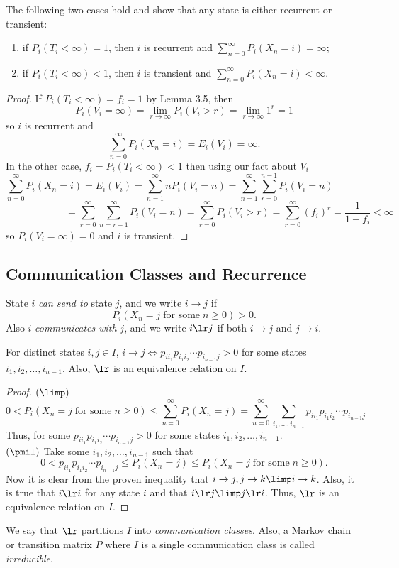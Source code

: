 \begin{thm} The following two cases hold and show that any state is either recurrent or transient:
\begin{enumerate}
\item if $P_i(T_i<\infty)=1$, then $i$ is recurrent and $\sum_{n=0}^{\infty}P_i(X_n=i)=\infty$;
\item if $P_i(T_i<\infty)<1$, then $i$ is transient and $\sum_{n=0}^{\infty}P_i(X_n=i)<\infty$.
\end{enumerate}
\end{thm}
\begin{proof} If $P_i(T_i<\infty)=f_i=1$ by Lemma 3.5, then
\[P_i(V_i=\infty)=\lim_{r \to \infty} P_i(V_i>r) = \lim_{r \to \infty} 1^r = 1 \]
so $i$ is recurrent and
\[\sum_{n=0}^{\infty}P_i(X_n=i)=E_i(V_i)=\infty.\]
In the other case, $f_i=P_i(T_i<\infty)<1$ then using our fact about $V_i$
\[\sum_{n=0}^{\infty}P_i(X_n=i)=E_i(V_i)=\sum_{n=1}^{\infty}nP_i(V_i=n)=\sum_{n=1}^{\infty}\sum_{r=0}^{n-1}P_i(V_i=n)\qquad\qquad\qquad\qquad\]
\[\qquad\qquad\qquad=\sum_{r=0}^{\infty}\sum_{n=r+1}^{\infty}P_i(V_i=n)=\sum_{r=0}^{\infty}P_i(V_i>r)=\sum_{r=0}^{\infty}(f_i)^r=\frac{1}{1-f_i}<\infty\]
so $P_i(V_i=\infty)=0$ and $i$ is transient.
\end{proof}

\subsection{Communication Classes and Recurrence}

\begin{defn} State $i$ \emph{can send to} state $j$, and we write $i \to j$ if
\[P_i(X_n=j \; \textrm{for some} \; n\geq0)>0.\]
Also $i$ \emph{communicates with} $j$, and we write $i \lr j$ if both $i \to j$ and $j \to i$.
\end{defn}

\begin{thm} For distinct states $i, j \in I$, $i \to j \iff p_{ii_1}p_{i_1i_2}\cdots p_{i_{n-1}j}>0$ for some states $i_1,i_2,\ldots,i_{n-1}$. Also, $\lr$ is an equivalence relation on $I$.
\end{thm}
\begin{proof} $(\limp)$
\[0<P_i(X_n=j \; \textrm{for some} \; n\geq0)\leq \sum_{n=0}^{\infty}P_i(X_n=j)= \sum_{n=0}^{\infty}\sum_{i_1,\ldots,i_{n-1}}p_{ii_1}p_{i_1i_2}\cdots p_{i_{n-1}j}\]
Thus, for some $p_{ii_1}p_{i_1i_2}\cdots p_{i_{n-1}j}>0$ for some states $i_1,i_2,\ldots,i_{n-1}$.\\
$(\pmil)$ Take some $i_1,i_2,\ldots,i_{n-1}$ such that
\[0<p_{ii_1}p_{i_1i_2}\cdots p_{i_{n-1}j}\leq P_i(X_n=j)\leq P_i(X_n=j \; \textrm{for some} \; n\geq0).\]
Now it is clear from the proven inequality that $i \to j, j \to k \limp i \to k$. Also, it is true that $i \lr i$ for any state $i$ and that $i \lr j \limp j \lr i$. Thus, $\lr$ is an equivalence relation on $I$.
\end{proof}
\begin{defn} We say that $\lr$ partitions $I$ into \emph{communication classes}. Also, a Markov chain or transition matrix $P$ where $I$ is a single communication class is called \emph{irreducible}.
\end{defn}

